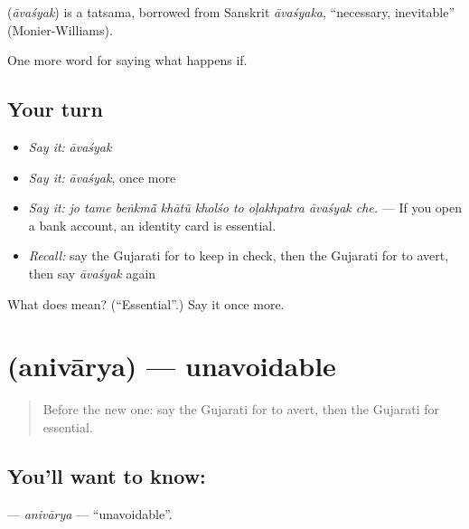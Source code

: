 \begin{cousinweb}
\textbf{} (\emph{āvaśyak}) is a tatsama, borrowed from Sanskrit \emph{āvaśyaka}, \textquotedblleft{}necessary, inevitable\textquotedblright{} (Monier-Williams).
\end{cousinweb}

\begin{grammarlens}[title={What you've built}]
One more word for saying what happens if.
\end{grammarlens}

\subsection*{Your turn}
\begin{itemize}
\raggedright
  \item \emph{Say it:} \emph{āvaśyak}
  \item \emph{Say it:} \emph{āvaśyak}, once more
  \item \emph{Say it:} \emph{jo tame beṅkmā̃ khātũ kholśo to oḷakhpatra āvaśyak che.} — If you open a bank account, an identity card is essential.
  \item \emph{Recall:} say the Gujarati for to keep in check, then the Gujarati for to avert, then say \emph{āvaśyak} again
\end{itemize}

\begin{tcolorbox}[breakable,colback=teal!4,colframe=teal!35!black,title={Before you move on}]
What does  mean? (\textquotedblleft{}Essential\textquotedblright{}.) Say it once more.
\end{tcolorbox}
\section[\texorpdfstring{\gu{અનિવાર્ય} (anivārya)}{અનિવાર્ય (anivārya)}]{ (anivārya) — unavoidable}

\label{lesson:GU-C375-anivarya}



\begin{quote}
Before the new one: say the Gujarati for to avert, then the Gujarati for essential.
\end{quote}

\subsection*{You'll want to know: }
\textbf{} — \emph{anivārya} — \textquotedblleft{}unavoidable\textquotedblright{}.

